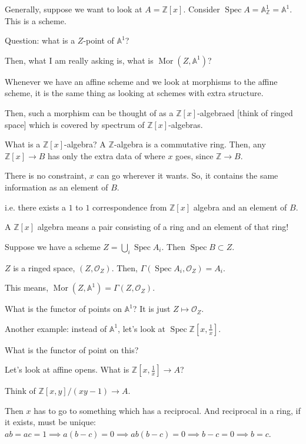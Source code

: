 \documentclass{article}
\theoremstyle{definition}
\begin{document}
    Generally, suppose we want to look at \(A = \mathbb{Z} [x]\). Consider \(\operatorname{Spec} A = \mathbb{A}^1_{\mathbb{Z}} = \mathbb{A}^1\). This is a scheme.

    Question: what is a \(Z\)-point of \(\mathbb{A}^1\)?

    Then, what I am really asking is, what is \(\operatorname{Mor} (Z, \mathbb{A}^1)\)?

    Whenever we have an affine scheme and we look at morphisms to the affine scheme, it is the same thing as looking at schemes with extra structure.

    Then, such a morphism can be thought of as a \(\mathbb{Z}[x]\)-algebraed [think of ringed space] which is covered by spectrum of \(\mathbb{Z}[x]\)-algebras.

    What is a \(\mathbb{Z}[x]\)-algebra? A \(\mathbb{Z}\)-algebra is a commutative ring. Then, any \(\mathbb{Z}[x] \to B\) has only the extra data of where \(x\) goes, since \(\mathbb{Z} \to B\).

    There is no constraint, \(x\) can go wherever it wants. So, it contains the same information as an element of \(B\).

    i.e. there exists a \(1\) to \(1\) correspondence from \(\mathbb{Z}[x]\) algebra and an element of \(B\).

    A \(\mathbb{Z}[x]\) algebra means a pair consisting of a ring and an element of that ring!

    Suppose we have a scheme \(Z = \bigcup_{i} \operatorname{Spec} A_i\). Then \(\operatorname{Spec} B \subset Z\).

    \(Z\) is a ringed space, \((Z, \mathcal{O}_Z)\). Then, \(\Gamma(\operatorname{Spec} A_i , \mathcal{O}_Z) = A_i\).
    
    This means, \(\operatorname{Mor} (Z, \mathbb{A}^1) = \Gamma(Z, \mathcal{O}_Z)\).

    What is the functor of points on \(\mathbb{A}^1\)? It is just \(Z \mapsto \mathcal{O}_Z\).

    Another example: instead of \(\mathbb{A}^1\), let's look at \(\operatorname{Spec} \mathbb{Z}\left[ x, \frac{1}{x} \right]\).

    What is the functor of point on this?

    Let's look at affine opens. What is \(\mathbb{Z} \left[ x, \frac{1}{x} \right] \to A\)?

    Think of \(\mathbb{Z}[x,y] / (xy - 1) \to A\).

    Then \(x\) has to go to something which has a reciprocal. And reciprocal in a ring, if it exists, must be unique: \(ab = ac = 1 \implies a(b - c) = 0 \implies ab(b-c) = 0 \implies b - c = 0 \implies b = c\).
\end{document}
